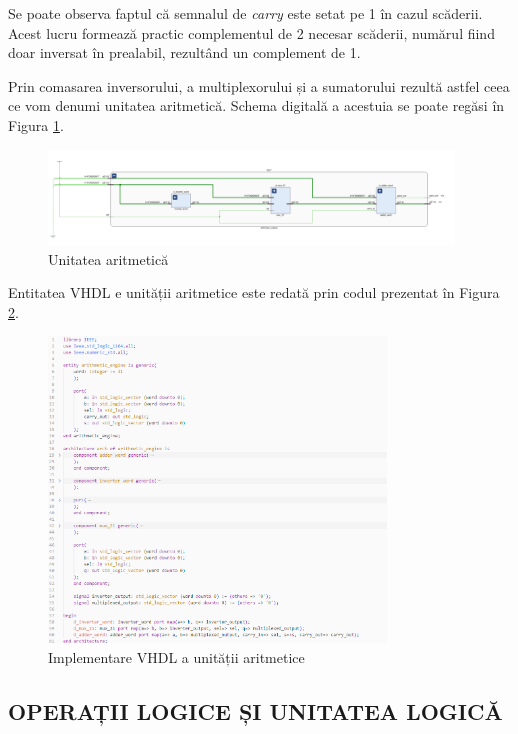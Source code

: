 \documentclass[12pt]{article}
\begin{document}
Se poate observa faptul că semnalul de \textit{carry} este setat pe 1 în cazul scăderii. Acest lucru formează practic complementul de 2 necesar scăderii, numărul fiind doar inversat în prealabil, rezultând un complement de 1.

Prin comasarea inversorului, a multiplexorului și a sumatorului rezultă astfel ceea ce vom denumi unitatea aritmetică. Schema digitală a acestuia se poate regăsi în Figura \ref{Figura:19}.

 \begin{figure}[h!]
 \includegraphics[width=0.96\textwidth]{ArithmeticEngine.png}
 \centering
 \caption{Unitatea aritmetică}
 \label{Figura:19}
 \end{figure}
 
Entitatea VHDL e unității aritmetice este redată prin codul prezentat în Figura \ref{Figura:60}.
 
 \begin{figure}[h!]
 \includegraphics[width=0.8\textwidth]{arithmeticengineVHDL.png}
 \centering
 \caption{Implementare VHDL a unității aritmetice}
 \label{Figura:60}
 \end{figure} 
 
 \subsection{OPERAȚII LOGICE ȘI UNITATEA LOGICĂ}
 
\end{document}

